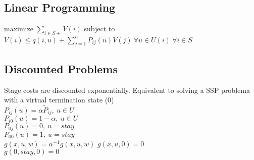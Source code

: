 \subsection*{Linear Programming}
maximize $\sum_{i\in S+} V(i)$ subject to\\
$V(i) \leq q(i,u) + \sum_{j=1}^n P_{ij}(u)V(j) \ \forall u \in U(i) \ \forall i \in S$
\subsection*{Discounted Problems}
Stage costs are discounted exponentially. Equivalent to solving a SSP problema with a virtual termination state (0)\\
$P_{ij}(u) = \alpha \widetilde{P}_{ij},\ u \in U$\\
$P_{i0}(u) = 1-\alpha,\ u \in U$\\
$P_{0j}(u) = 0,\ u = stay$\\
$P_{00}(u) = 1,\ u = stay$\\
$g(x,u,w) = \alpha^{-1}\widetilde{g}(x,u,w)$
$g(x,u,0) = 0$\\
$g(0,stay,0) = 0$
